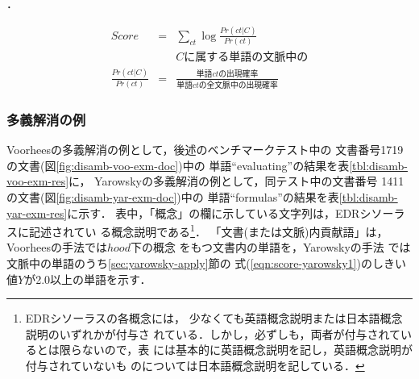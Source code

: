 ．

\begin{eqnarray}
 Score & = & \sum_{ct}\log\frac{Pr(ct|C)}{Pr(ct)}\label{eqn:score-yarowsky2}\\[1ex]
 &  & Cに属する単語の文脈中の\nonumber\\[0zh]
 \frac{Pr(ct|C)}{Pr(ct)} & = & \frac{単語ctの出現確率}{単語ctの全文脈中の出現確率}\label{eqn:score-yarowsky1}
\end{eqnarray}


\subsubsection{多義解消の例}
Voorheesの多義解消の例として，後述のベンチマークテスト中の
文書番号1719の文書(図\ref{fig:disamb-voo-exm-doc})中の
単語``evaluating''の結果を表\ref{tbl:disamb-voo-exm-res}に，
Yarowskyの多義解消の例として，同テスト中の文書番号
1411の文書(図\ref{fig:disamb-yar-exm-doc})中の
単語``formulas''の結果を表\ref{tbl:disamb-yar-exm-res}に示す．
表中，「概念」の欄に示している文字列は，EDRシソーラスに記述されてい
る概念説明である\footnote{EDRシソーラスの各概念には，
少なくても英語概念説明または日本語概念説明のいずれかが付与さ
れている．しかし，必ずしも，両者が付与されているとは限らないので，表
には基本的に英語概念説明を記し，英語概念説明が付与されていないも
のについては日本語概念説明を記している．}．
「文書(または文脈)内貢献語」は，Voorheesの手法では$hood$下の概念
をもつ文書内の単語を，Yarowskyの手法
では文脈中の単語のうち\ref{sec:yarowsky-apply}節の
式(\ref{eqn:score-yarowsky1})のしきい値$Y$が2.0以上の単語を示す．

